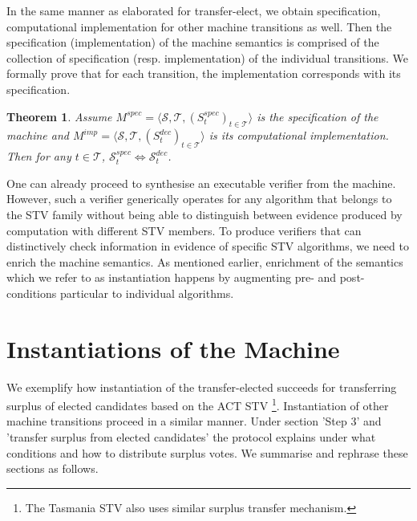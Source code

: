 \documentclass[10pt,conference]{IEEEtran}
\newtheorem{theorem}{Theorem}
\begin{document}
In the same manner as elaborated for transfer-elect, we obtain specification, computational implementation for other machine transitions as well. Then the specification (implementation) of the machine semantics is comprised of the collection of specification (resp. implementation) of the individual transitions. We formally prove that for each transition, the implementation corresponds with its specification.

\begin{theorem}
Assume $M^{spec} = \langle \mathcal{S}, \mathcal{T}, (S_{t}^{spec})_{t \in \mathcal{T}} \rangle$ is the specification of the machine and  $M^{imp} = \langle \mathcal{S}, \mathcal{T}, (S_{t}^{dec})_{t \in \mathcal{T}} \rangle$ is its computational implementation. Then for any $t\in\mathcal{T}$,  $\mathcal{S}_{t}^{spec}\Leftrightarrow\mathcal{S}_{t}^{dec}$.      
\end{theorem}




One can already proceed to synthesise an executable verifier from the machine. However, such a verifier  generically operates for any algorithm that belongs to the STV family without being able to distinguish between evidence produced by computation with different STV members. To produce verifiers that can distinctively check information in evidence of specific STV algorithms, we need to enrich the machine semantics. As mentioned earlier, enrichment of the semantics which we refer to as instantiation happens by augmenting pre- and post-conditions particular to individual algorithms. %

\section{Instantiations of the Machine}\label{sec:InstMachine}
We exemplify how instantiation of the transfer-elected succeeds for transferring surplus of elected candidates based on the ACT STV
\footnote{The Tasmania STV also uses similar surplus transfer mechanism.}. Instantiation of other machine transitions proceed in a  similar manner.    
Under section 'Step 3' and 'transfer surplus from elected candidates' the protocol explains under what conditions and how to distribute surplus votes. We summarise and rephrase these sections as follows. 
\end{document}
